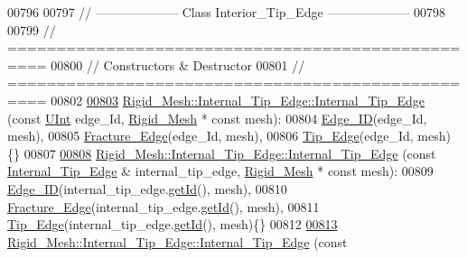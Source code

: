 \begin{DoxyCode}
00796 
00797 \textcolor{comment}{// --------------------   Class Interior\_Tip\_Edge   --------------------}
00798 
00799 \textcolor{comment}{// ==================================================}
00800 \textcolor{comment}{// Constructors & Destructor}
00801 \textcolor{comment}{// ==================================================}
00802 
\hypertarget{RigidMesh_8cpp_source.tex_l00803}{}\hyperlink{classFVCode3D_1_1Rigid__Mesh_1_1Internal__Tip__Edge_a72df5810047bdf0fa4a90b479a8d1121}{00803} \hyperlink{classFVCode3D_1_1Rigid__Mesh_1_1Internal__Tip__Edge_a72df5810047bdf0fa4a90b479a8d1121}{Rigid\_Mesh::Internal\_Tip\_Edge::Internal\_Tip\_Edge} (\textcolor{keyword}{const} 
      \hyperlink{namespaceFVCode3D_a4bf7e328c75d0fd504050d040ebe9eda}{UInt} edge\_Id, \hyperlink{classFVCode3D_1_1Rigid__Mesh}{Rigid\_Mesh} * \textcolor{keyword}{const} mesh):
00804     \hyperlink{classFVCode3D_1_1Rigid__Mesh_1_1Edge__ID}{Edge\_ID}(edge\_Id, mesh),
00805     \hyperlink{classFVCode3D_1_1Rigid__Mesh_1_1Fracture__Edge}{Fracture\_Edge}(edge\_Id, mesh),
00806     \hyperlink{classFVCode3D_1_1Rigid__Mesh_1_1Tip__Edge}{Tip\_Edge}(edge\_Id, mesh)\{\}
00807 
\hypertarget{RigidMesh_8cpp_source.tex_l00808}{}\hyperlink{classFVCode3D_1_1Rigid__Mesh_1_1Internal__Tip__Edge_abfeee084644b2e286cae2b1f54dd5725}{00808} \hyperlink{classFVCode3D_1_1Rigid__Mesh_1_1Internal__Tip__Edge_a72df5810047bdf0fa4a90b479a8d1121}{Rigid\_Mesh::Internal\_Tip\_Edge::Internal\_Tip\_Edge} (\textcolor{keyword}{const} 
      \hyperlink{classFVCode3D_1_1Rigid__Mesh_1_1Internal__Tip__Edge}{Internal\_Tip\_Edge} & internal\_tip\_edge, \hyperlink{classFVCode3D_1_1Rigid__Mesh}{Rigid\_Mesh} * \textcolor{keyword}{const} mesh):
00809     \hyperlink{classFVCode3D_1_1Rigid__Mesh_1_1Edge__ID}{Edge\_ID}(internal\_tip\_edge.\hyperlink{classFVCode3D_1_1Rigid__Mesh_1_1Edge__ID_af17ee26739dd0bb462a21a90c2c1e633}{getId}(), mesh),
00810     \hyperlink{classFVCode3D_1_1Rigid__Mesh_1_1Fracture__Edge}{Fracture\_Edge}(internal\_tip\_edge.\hyperlink{classFVCode3D_1_1Rigid__Mesh_1_1Edge__ID_af17ee26739dd0bb462a21a90c2c1e633}{getId}(), mesh),
00811     \hyperlink{classFVCode3D_1_1Rigid__Mesh_1_1Tip__Edge}{Tip\_Edge}(internal\_tip\_edge.\hyperlink{classFVCode3D_1_1Rigid__Mesh_1_1Edge__ID_af17ee26739dd0bb462a21a90c2c1e633}{getId}(), mesh)\{\}
00812 
\hypertarget{RigidMesh_8cpp_source.tex_l00813}{}\hyperlink{classFVCode3D_1_1Rigid__Mesh_1_1Internal__Tip__Edge_a7c363edbfdc751972e6666389f44d861}{00813} \hyperlink{classFVCode3D_1_1Rigid__Mesh_1_1Internal__Tip__Edge_a72df5810047bdf0fa4a90b479a8d1121}{Rigid\_Mesh::Internal\_Tip\_Edge::Internal\_Tip\_Edge} (\textcolor{keyword}{const} 

\end{DoxyCode}
